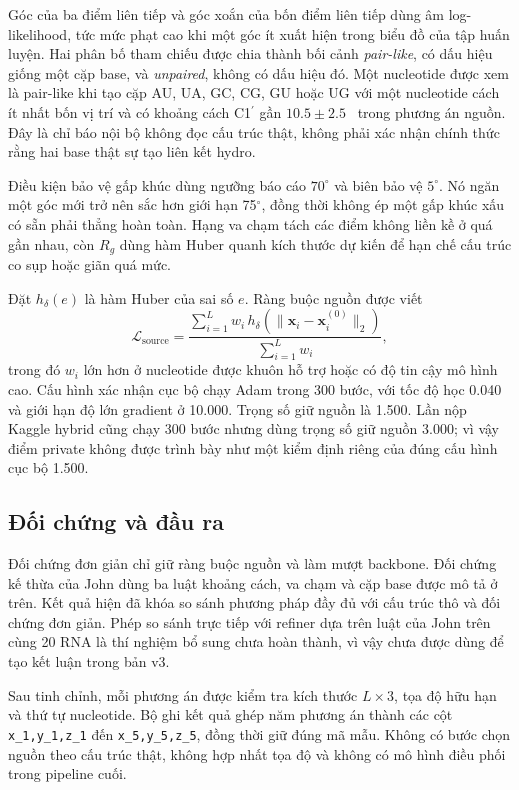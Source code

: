 \documentclass[12pt,a4paper,oneside]{report}
\newcommand{\cprime}{C1$^{\prime}$}
\newcommand{\angstrom}{\text{\AA}}
\begin{document}
Góc của ba điểm liên tiếp và góc xoắn của bốn điểm liên tiếp dùng âm log-likelihood, tức
mức phạt cao khi một góc ít xuất hiện trong biểu đồ của tập huấn luyện. Hai phân bố tham
chiếu được chia thành bối cảnh \emph{pair-like}, có dấu hiệu giống một cặp base, và
\emph{unpaired}, không có dấu hiệu đó. Một nucleotide được xem là pair-like khi tạo cặp AU, UA, GC, CG, GU
hoặc UG với một nucleotide cách ít nhất bốn vị trí và có khoảng cách \cprime{} gần
$10.5\pm2.5$~\angstrom{} trong phương án nguồn. Đây là chỉ báo nội bộ không đọc cấu trúc thật,
không phải xác nhận chính thức rằng hai base thật sự tạo liên kết hydro.

Điều kiện bảo vệ gấp khúc dùng ngưỡng báo cáo $70^\circ$ và biên bảo vệ $5^\circ$. Nó ngăn một góc mới
trở nên sắc hơn giới hạn 75$^\circ$, đồng thời không ép một gấp khúc xấu có sẵn phải thẳng
hoàn toàn. Hạng va chạm tách các điểm không liền kề ở quá gần nhau, còn $R_g$ dùng hàm
Huber quanh kích thước dự kiến để hạn chế cấu trúc co sụp hoặc giãn quá mức.

Đặt $h_\delta(e)$ là hàm Huber của sai số $e$. Ràng buộc nguồn được viết
\begin{equation}
\mathcal{L}_{\mathrm{source}}=
\frac{\sum_{i=1}^{L}w_i\,
h_\delta\!\left(\lVert \mathbf{x}_i-\mathbf{x}^{(0)}_i\rVert_2\right)}
{\sum_{i=1}^{L}w_i},
\end{equation}
trong đó $w_i$ lớn hơn ở nucleotide được khuôn hỗ trợ hoặc có độ tin cậy mô hình cao.
Cấu hình xác nhận cục bộ chạy Adam trong 300 bước, với tốc độ học 0.040 và giới hạn độ
lớn gradient ở 10.000. Trọng số giữ nguồn là 1.500. Lần nộp Kaggle hybrid cũng chạy 300
bước nhưng dùng trọng số giữ nguồn 3.000; vì vậy điểm private không được trình bày như một kiểm định riêng
của đúng cấu hình cục bộ 1.500.

\subsection{Đối chứng và đầu ra}

Đối chứng đơn giản chỉ giữ ràng buộc nguồn và làm mượt backbone. Đối chứng kế thừa của
John dùng ba luật khoảng cách, va chạm và cặp base được mô tả ở trên. Kết quả hiện đã khóa
so sánh phương pháp đầy đủ với cấu trúc thô và đối chứng đơn giản. Phép so sánh trực tiếp
với refiner dựa trên luật của John trên cùng 20 RNA là thí nghiệm bổ sung chưa hoàn thành,
vì vậy chưa được dùng để tạo kết luận trong bản v3.

Sau tinh chỉnh, mỗi phương án được kiểm tra kích thước $L\times3$, tọa độ hữu hạn và thứ
tự nucleotide. Bộ ghi kết quả ghép năm phương án thành các cột \texttt{x\_1,y\_1,z\_1}
đến \texttt{x\_5,y\_5,z\_5}, đồng thời giữ đúng mã mẫu. Không có bước chọn nguồn theo cấu
trúc thật, không hợp nhất tọa độ và không có mô hình điều phối trong pipeline cuối.
\end{document}
